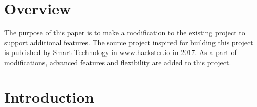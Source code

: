 \documentclass[12pt,journal]{IEEEtran}
\begin{document}
\maketitle




%
\onehalfspacing
\section{Overview}
The purpose of this paper is to make a modification to the existing project to support additional features. The source project inspired for building this project is published by Smart Technology in www.hackster.io in 2017. As a part of modifications, advanced features and flexibility are added to this project.

\section{Introduction}
\end{document}
